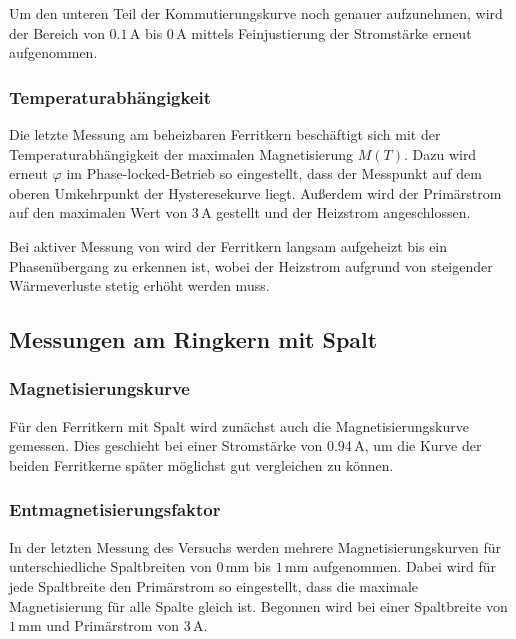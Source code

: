 \documentclass[12pt,a4paper]{scrartcl}
\numberwithin{equation}{section} %
\renewcommand{\[}{} %
\renewcommand{\]}{\noindent} %
\begin{document}
Um den unteren Teil der Kommutierungskurve noch genauer aufzunehmen,
wird der Bereich von \(0.1\,\mathrm A\) bis \(0\,\mathrm A\) mittels
Feinjustierung der Stromstärke erneut aufgenommen.

\hypertarget{temperaturabhuxe4ngigkeit}{%
\subsubsection{Temperaturabhängigkeit}\label{temperaturabhuxe4ngigkeit}}

Die letzte Messung am beheizbaren Ferritkern beschäftigt sich mit der
Temperaturabhängigkeit der maximalen Magnetisierung \(M(T)\). Dazu wird
erneut \(\varphi\) im Phase-locked-Betrieb so eingestellt, dass der
Messpunkt auf dem oberen Umkehrpunkt der Hysteresekurve liegt. Außerdem
wird der Primärstrom auf den maximalen Wert von \(3\,\mathrm A\)
gestellt und der Heizstrom angeschlossen.

Bei aktiver Messung von wird der Ferritkern langsam aufgeheizt bis ein
Phasenübergang zu erkennen ist, wobei der Heizstrom aufgrund von
steigender Wärmeverluste stetig erhöht werden muss.

\hypertarget{messungen-am-ringkern-mit-spalt}{%
\subsection{Messungen am Ringkern mit
Spalt}\label{messungen-am-ringkern-mit-spalt}}

\hypertarget{magnetisierungskurve-1}{%
\subsubsection{Magnetisierungskurve}\label{magnetisierungskurve-1}}

Für den Ferritkern mit Spalt wird zunächst auch die Magnetisierungskurve
gemessen. Dies geschieht bei einer Stromstärke von \(0.94\,\mathrm A\),
um die Kurve der beiden Ferritkerne später möglichst gut vergleichen zu
können.

\hypertarget{entmagnetisierungsfaktor-1}{%
\subsubsection{Entmagnetisierungsfaktor}\label{entmagnetisierungsfaktor-1}}

In der letzten Messung des Versuchs werden mehrere Magnetisierungskurven
für unterschiedliche Spaltbreiten von \(0\,\mathrm{mm}\) bis
\(1\,\mathrm{mm}\) aufgenommen. Dabei wird für jede Spaltbreite den
Primärstrom so eingestellt, dass die maximale Magnetisierung für alle
Spalte gleich ist. Begonnen wird bei einer Spaltbreite von
\(1\,\mathrm{mm}\) und Primärstrom von \(3\,\mathrm A\).
\end{document}
